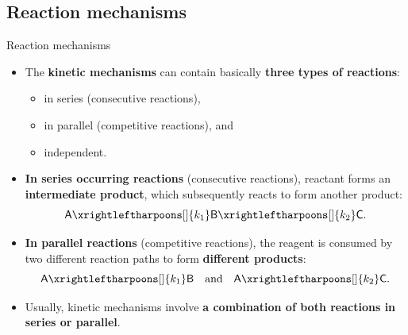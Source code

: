 \subsection{Reaction mechanisms}
%
%
\begin{frame}[<+->]{Reaction mechanisms}
	\small
	\begin{itemize}
		\item The \alert{\bf kinetic mechanisms} can contain basically {\bf three types of reactions}:
		\begin{itemize}
			\item in series (consecutive reactions), 
			\item in parallel (competitive reactions), and 
			\item independent.
		\end{itemize}
		\item \alert{\bf In series occurring reactions} (consecutive reactions), reactant forms an {\bf intermediate product}, which subsequently reacts to form another product:
		\[\mathsf{A} \xrightleftharpoons[]{k_1} \mathsf{B} \xrightleftharpoons[]{k_2} \mathsf{C}. \]
		\item \alert{\bf In parallel reactions} (competitive reactions), the reagent is consumed by two different reaction paths to form {\bf different products}:
		\[\mathsf{A} \xrightleftharpoons[]{k_1} \mathsf{B} \quad \mbox{and}\quad \mathsf{A} \xrightleftharpoons[]{k_2} \mathsf{C}. \]
		\item Usually, kinetic mechanisms involve {\bf a combination of both reactions in series or parallel}.
	\end{itemize}
\end{frame}
%
%
